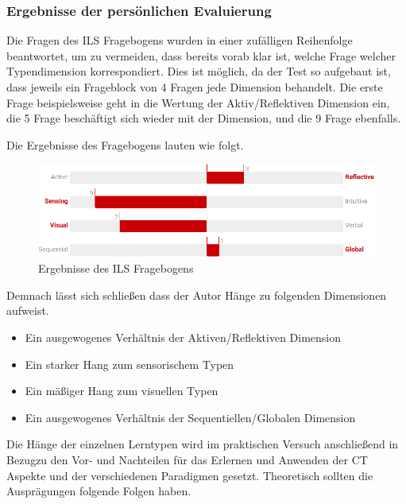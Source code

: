 \subsubsection{Ergebnisse der persönlichen Evaluierung}
Die Fragen des ILS Fragebogens wurden in einer zufälligen Reihenfolge beantwortet, um zu vermeiden, dass bereits vorab klar ist, welche Frage welcher Typendimension korrespondiert. Dies ist möglich, da der Test so aufgebaut ist, dass jeweils ein Frageblock von 4 Fragen jede Dimension behandelt. Die erste Frage beispielsweise geht in die Wertung der Aktiv/Reflektiven Dimension ein, die 5 Frage beschäftigt sich wieder mit der Dimension, und die 9 Frage ebenfalls.

Die Ergebnisse des Fragebogens lauten wie folgt.

\begin{figure}[H]
    \centering
    \includegraphics[width=1\linewidth]{Figures/Section_4/ILS_result}
    \caption{Ergebnisse des ILS Fragebogens}
\end{figure}

Demnach lässt sich schließen dass der Autor Hänge zu folgenden Dimensionen aufweist.

\begin{itemize}
    \item Ein ausgewogenes Verhältnis der Aktiven/Reflektiven Dimension
    \item Ein starker Hang zum sensorischem Typen 
    \item Ein mäßiger Hang zum visuellen Typen
    \item Ein ausgewogenes Verhältnis der Sequentiellen/Globalen Dimension
\end{itemize}

Die Hänge der einzelnen Lerntypen wird im praktischen Versuch anschließend in Bezugzu den Vor- und Nachteilen für das Erlernen und Anwenden der CT Aspekte und der verschiedenen Paradigmen gesetzt.
Theoretisch sollten die Ausprägungen folgende Folgen haben.

